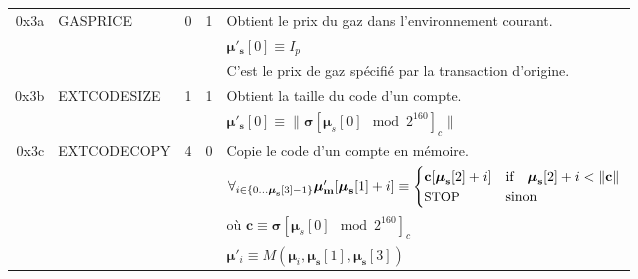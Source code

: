 \documentclass[9pt,oneside]{amsart}
\begin{document}
\begin{tabular*}{\columnwidth}[h]{rlrrl}
\midrule
0x3a & {\small GASPRICE} & 0 & 1 & Obtient le prix du gaz dans l'environnement courant. \\
&&&& $\boldsymbol{\mu}'_\mathbf{s}[0] \equiv I_p$ \\
&&&& C'est le prix de gaz spécifié par la transaction d'origine.\\
\midrule
0x3b & {\small EXTCODESIZE} & 1 & 1 & Obtient la taille du code d'un compte. \\
&&&& $\boldsymbol{\mu}'_\mathbf{s}[0] \equiv \lVert \boldsymbol{\sigma}[\boldsymbol{\mu}_s[0] \mod 2^{160}]_c \rVert$ \\
\midrule
0x3c & {\small EXTCODECOPY} & 4 & 0 & Copie le code d'un compte en mémoire. \\
&&&& $\forall_{i \in \{ 0 \dots \boldsymbol{\mu}_\mathbf{s}[3] - 1\} } \boldsymbol{\mu}'_\mathbf{m}[\boldsymbol{\mu}_\mathbf{s}[1] + i ] \equiv
\begin{cases} \mathbf{c}[\boldsymbol{\mu}_\mathbf{s}[2] + i] & \text{if} \quad \boldsymbol{\mu}_\mathbf{s}[2] + i < \lVert \mathbf{c} \rVert \\ \text{\small STOP} & \text{sinon} \end{cases}$\\
&&&& où $\mathbf{c} \equiv \boldsymbol{\sigma}[\boldsymbol{\mu}_s[0] \mod 2^{160}]_c$ \\
&&&& $\boldsymbol{\mu}'_i \equiv M(\boldsymbol{\mu}_i, \boldsymbol{\mu}_\mathbf{s}[1], \boldsymbol{\mu}_\mathbf{s}[3])$ \\
\bottomrule
\end{tabular*}
\end{document}
